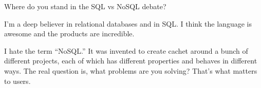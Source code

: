 \documentclass{beamer}
\begin{document}
\begin{frame}

Where do you stand in the SQL vs NoSQL debate?

I’m a deep believer in relational databases and in SQL. I think the language is awesome and the products are incredible.

I hate the term “NoSQL.” It was invented to create cachet around a bunch of different projects, each of which has different properties and behaves in different ways. The real question is, what problems are you solving? That’s what matters to users.
\end{frame}
\end{document}
